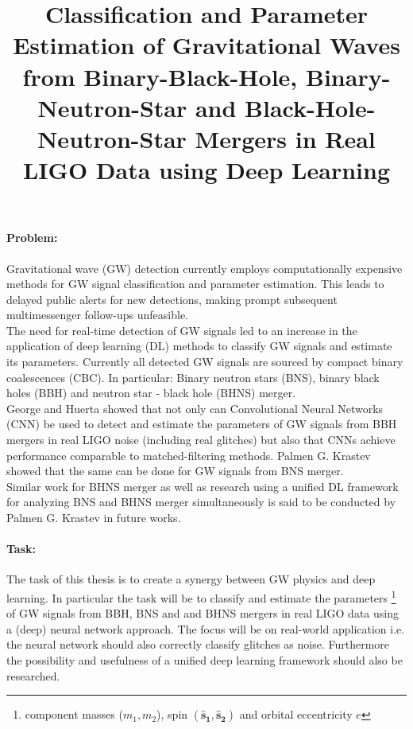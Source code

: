 \documentclass[12pt]{article}
\title{Classification and Parameter Estimation of Gravitational Waves from
Binary-Black-Hole, Binary-Neutron-Star and Black-Hole-Neutron-Star Mergers in
Real LIGO Data using Deep Learning}
\begin{document}
\maketitle

\paragraph{Problem:}
Gravitational wave (GW) detection currently employs computationally expensive
methods for GW signal classification and parameter estimation. This leads to
delayed public alerts for new detections, making prompt subsequent
multimessenger follow-ups unfeasible. \\

The need for real-time detection of GW signals led to an increase in the
application of deep learning (DL) methods to classify GW signals and estimate
its parameters. Currently all detected GW signals are sourced by compact binary
coalescences (CBC). In particular: Binary neutron stars (BNS), binary black
holes (BBH) and neutron star - black hole (BHNS) merger. \\

George and Huerta showed \cite{BBHmerger} that not only can Convolutional Neural
Networks (CNN) be used to detect and estimate the parameters of GW signals from
BBH mergers in real LIGO noise (including real glitches) but also that CNNs
achieve performance comparable to matched-filtering methods. Palmen G. Krastev
showed \cite{NSmerger} that the same can be done for GW signals from BNS merger.
\\

Similar work for BHNS merger as well as research using a unified DL framework
for analyzing BNS and BHNS merger simultaneously is said to be conducted by
Palmen G. Krastev \cite{NSmerger} in future works.

\paragraph{Task:}
The task of this thesis is to create a synergy between GW physics and deep
learning. In particular the task will be to classify and estimate the parameters
\footnote{component masses ($m_1, m_2$), spin $(\mathbf{\hat{s}_1},
\mathbf{\hat{s}_2})$ and orbital eccentricity $e$} of GW signals from BBH, BNS
and  and BHNS mergers in real LIGO data using a (deep) neural network approach.
The focus will be on real-world application i.e. the neural network should also
correctly classify glitches as noise. Furthermore the possibility and usefulness
of a unified deep learning framework should also be researched. \\
\end{document}
